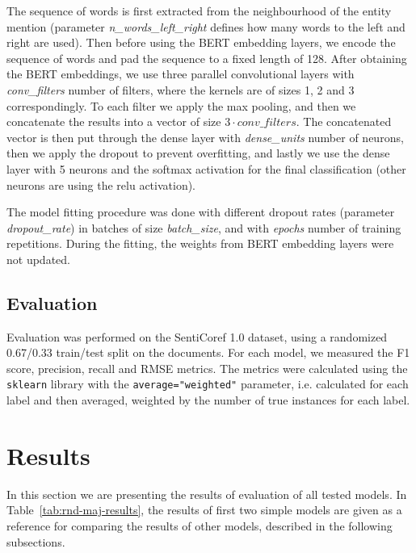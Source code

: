 \documentclass[11pt,a4paper]{article}
\begin{document}
The sequence of words is first extracted from the neighbourhood of the entity mention (parameter \textit{n\_words\_left\_right} defines how many words to the left and right are used).
Then before using the BERT embedding layers, we encode the sequence of words and pad the sequence to a fixed length of 128.
After obtaining the BERT embeddings, we use three parallel convolutional layers with \textit{conv\_filters} number of filters, where the kernels are of sizes 1, 2 and 3 correspondingly.
To each filter we apply the max pooling, and then we concatenate the results into a vector of size $3 \cdot \textit{conv\_filters}$.
The concatenated vector is then put through the dense layer with \textit{dense\_units} number of neurons, then we apply the dropout to prevent overfitting, and lastly we use the dense layer with 5 neurons and the softmax activation for the final classification (other neurons are using the relu activation).

The model fitting procedure was done with different dropout rates (parameter \textit{dropout\_rate}) in batches of size \textit{batch\_size}, and with \textit{epochs} number of training repetitions.
During the fitting, the weights from BERT embedding layers were not updated.

\subsection{Evaluation}

Evaluation was performed on the SentiCoref 1.0 dataset, using a randomized 0.67/0.33 train/test split on the documents.
For each model, we measured the F1 score, precision, recall and RMSE metrics.
The metrics were calculated using the \texttt{sklearn} library with the \texttt{average="weighted"} parameter, i.e. calculated for each label and then averaged, weighted by the number of true instances for each label.



\section{Results}

In this section we are presenting the results of evaluation of all tested models.
In Table~\ref{tab:rnd-maj-results}, the results of first two simple models are given as a reference for comparing the results of other models, described in the following subsections.
\end{document}
